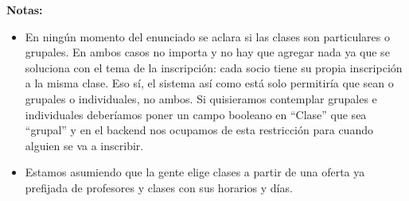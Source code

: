 \documentclass[12pt]{article}
\begin{document}
\textbf{Notas:} 
\begin{itemize}
    \item En ningún momento del enunciado se aclara si las clases son particulares o grupales. En ambos casos no importa y no hay que agregar nada ya que se soluciona con el tema de la inscripción: cada socio tiene su propia inscripción a la misma clase. Eso sí, el sistema así como está solo permitiría que sean o grupales o individuales, no ambos. Si quisieramos contemplar grupales e individuales deberíamos poner un campo booleano en ``Clase'' que sea ``grupal'' y en el backend nos ocupamos de esta restricción para cuando alguien se va a inscribir.
    \item Estamos asumiendo que la gente elige clases a partir de una oferta ya prefijada de profesores y clases con sus horarios y días.
\end{itemize}
\end{document}
